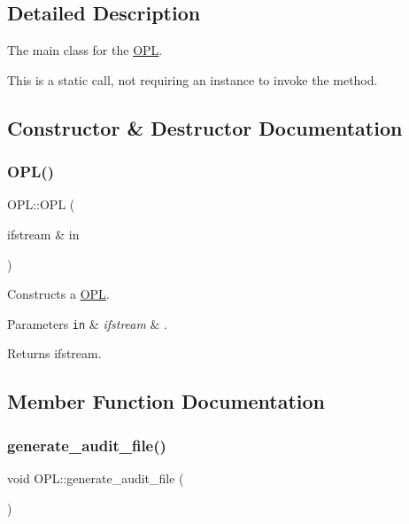 \subsection{Detailed Description}
The main class for the \hyperlink{classOPL}{O\+PL}. 

This is a static call, not requiring an instance to invoke the method. 

\subsection{Constructor \& Destructor Documentation}
\mbox{\label{classOPL_a5784a8f6afe69d2ed05473e1517b4b89}} 
\subsubsection{\texorpdfstring{O\+P\+L()}{OPL()}}
{\footnotesize\ttfamily O\+P\+L\+::\+O\+PL (\begin{DoxyParamCaption}\item[{ifstream \&}]{in }\end{DoxyParamCaption})}



Constructs a \hyperlink{classOPL}{O\+PL}. 


\begin{DoxyParams}[1]{Parameters}
\mbox{\tt in}  & {\em ifstream} & .\\
\hline
\end{DoxyParams}
\begin{DoxyReturn}{Returns}
ifstream. 
\end{DoxyReturn}


\subsection{Member Function Documentation}
\mbox{\label{classOPL_a722c21c660660dc97da0c4e07f6fd4e1}} 
\subsubsection{\texorpdfstring{generate\+\_\+audit\+\_\+file()}{generate\_audit\_file()}}
{\footnotesize\ttfamily void O\+P\+L\+::generate\+\_\+audit\+\_\+file (\begin{DoxyParamCaption}{ }\end{DoxyParamCaption})}



